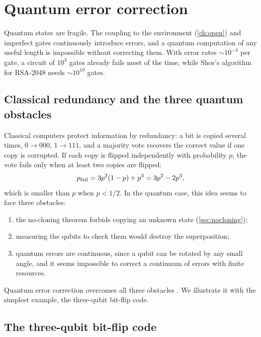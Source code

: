 \chapter{Quantum error correction}\label{ch:qec}

Quantum states are fragile. The coupling to the environment (\cref{ch:open}) and imperfect gates continuously introduce errors, and a quantum computation of any useful length is impossible without correcting them.
With error rates $\sim10^{-3}$ per gate, a circuit of $10^3$ gates already fails most of the time, while Shor's algorithm for RSA-2048 needs $\sim10^{10}$ gates.

\section{Classical redundancy and the three quantum obstacles}
Classical computers protect information by redundancy: a bit is copied several times, $0\to000$, $1\to111$, and a majority vote recovers the correct value if one copy is corrupted. If each copy is flipped independently
with probability $p$, the vote fails only when at least two copies are flipped:
\begin{equation}
  p_{\rm fail}=3p^2(1-p)+p^3=3p^2-2p^3,
\end{equation}
which is smaller than $p$ when $p<1/2$. In the quantum case, this idea seems to face three obstacles:
\begin{enumerate}
  \item the no-cloning theorem forbids copying an unknown state (\cref{sec:nocloning});
  \item measuring the qubits to check them would destroy the superposition;
  \item quantum errors are continuous, since a qubit can be rotated by any small angle, and it seems impossible to correct a continuum of errors with finite resources.
\end{enumerate}
Quantum error correction overcomes all three obstacles \cite{Shor1995}. We illustrate it with the simplest example, the three-qubit bit-flip code.

\section{The three-qubit bit-flip code}
